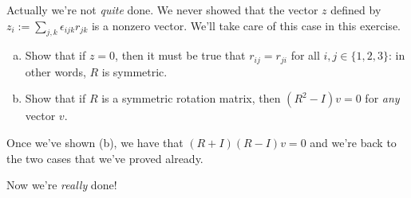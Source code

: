 \begin{exercise}{}
Actually we're not \emph{quite} done. We never showed that the vector $z$ defined by $z_i := \sum_{j,k} \epsilon_{ijk} r_{jk}$ is a nonzero vector. We'll take care of this case in this exercise.
\begin{enumerate}[(a)]
\item
Show that if $z=0$, then it must be true that $r_{ij}=r_{ji}$ for all $i,j \in \{1,2,3\}$: in other words, $R$ is symmetric.
\item
Show that if $R$ is a symmetric rotation matrix, then $(R^2 - I) v = 0$ for \emph{any} vector $v$.
\end{enumerate}
Once we've shown (b), we have that $(R+I)(R-I)v=0$ and we're back to the two cases that we've proved already.
\end{exercise}

Now we're \emph{really} done!

